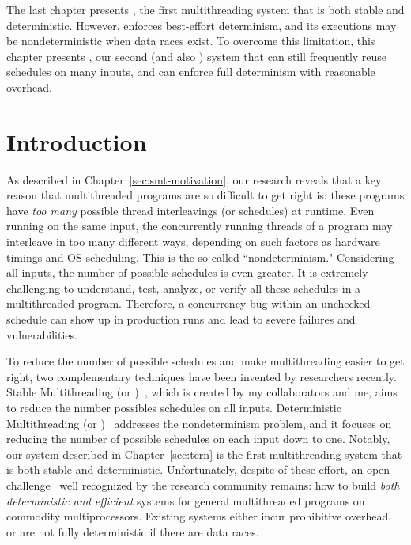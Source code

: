 The last chapter presents \tern, the first multithreading system that is both 
stable and deterministic. However, \tern enforces best-effort determinism, and 
its executions may be nondeterministic when data races exist. To overcome this 
limitation, this chapter presents \peregrine, our second \smt (and also \dmt) 
system that can still frequently reuse schedules on many inputs, and can 
enforce full determinism with reasonable overhead.

\section{Introduction} \label{sec:peregrine-intro}

As described in Chapter~\ref{sec:smt-motivation}, our research reveals that a
key reason that multithreaded programs are so difficult to get right is: these
programs have \emph{too many} possible thread interleavings (or schedules) at
runtime. Even running on the same input, the concurrently running threads of a
program may interleave in too many different ways, depending on such factors as
hardware timings and OS scheduling. This is the so called ``nondeterminism."
Considering all inputs, the number of possible schedules is even greater. It is
extremely challenging to understand, test, analyze, or verify all
these schedules in a multithreaded program. Therefore, a concurrency bug within
an unchecked schedule can show up in production runs and lead to severe
failures and vulnerabilities.

To reduce the number of possible schedules and make multithreading easier to get
right, two complementary techniques have been invented by researchers recently.
Stable Multithreading (or \smt)~\cite{determinator:osdi10, cui:tern:osdi10}, 
which
is created by my collaborators and me, aims to reduce the number possibles
schedules on all inputs. Deterministic Multithreading
(or \dmt)~\cite{dmp:asplos09,kendo:asplos09,coredet:asplos10,
dos:osdi10,grace:oopsla09} addresses the nondeterminism problem, and it focuses
on reducing the number of possible schedules on each input down to one. Notably,
our \tern system described in Chapter~\ref{sec:tern} is the first 
multithreading system that is both stable and deterministic. Unfortunately, 
despite of these effort, an open challenge~\cite{wodet11}
well recognized by the research community remains: how to build \emph{both
deterministic and efficient} \dmt systems for general multithreaded programs on
commodity multiprocessors.  Existing \dmt systems either incur prohibitive
overhead, or are not fully deterministic if there are data races.

